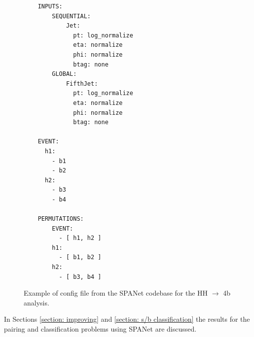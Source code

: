 \begin{figure}[hbt]
    \centering
    \begin{verbatim}
    INPUTS:
        SEQUENTIAL:
            Jet:
              pt: log_normalize
              eta: normalize
              phi: normalize
              btag: none
        GLOBAL:
            FifthJet:
              pt: log_normalize
              eta: normalize
              phi: normalize
              btag: none

    EVENT:
      h1:
        - b1
        - b2
      h2:
        - b3
        - b4

    PERMUTATIONS:
        EVENT:
          - [ h1, h2 ]
        h1:
          - [ b1, b2 ]
        h2:
          - [ b3, b4 ]
\end{verbatim}
    \caption{Example of config file from the SPANet codebase for the HH $\to$ 4b analysis.}
    \label{fig: config}
\end{figure}

In Sections \ref{section: improving} and \ref{section: s/b classification} the results for the pairing and classification problems using SPANet are discussed. 